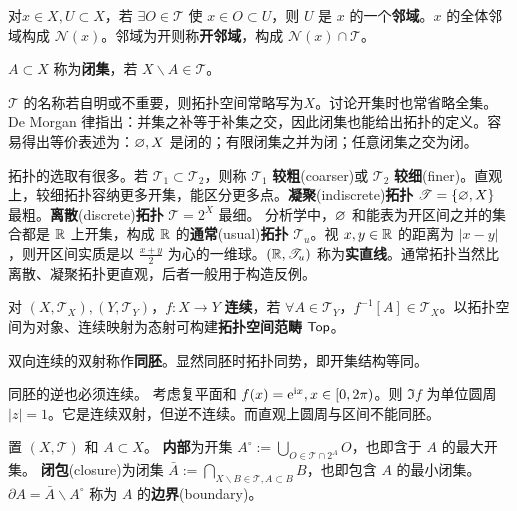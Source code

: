 \begin{definition}
    对$x\in X,U\subset X$，若 $\exists O\in\mathscr{T}$ 使 $x\in O\subset U$，则 $U$ 是 $x$ 的一个\textbf{邻域}。$x$ 的全体邻域构成 $\mathscr N(x)$。邻域为开则称\textbf{开邻域}，构成 $\mathscr N(x)\cap\mathscr T$。
\end{definition}

\begin{definition}
    $A\subset X$ 称为\textbf{闭集}，若 $X\backslash A\in\mathscr{T}$。
\end{definition}

$\mathscr T$ 的名称若自明或不重要，则拓扑空间常略写为$X$。讨论开集时也常省略全集。De Morgan 律指出：并集之补等于补集之交，因此闭集也能给出拓扑的定义。容易得出等价表述为：$\varnothing,X$ 是闭的；有限闭集之并为闭；任意闭集之交为闭。

拓扑的选取有很多。若 $\mathscr T_1\subset\mathscr T_2$，则称 $\mathscr T_1$ \textbf{较粗}(coarser)或 $\mathscr T_2$ \textbf{较细}(finer)。直观上，较细拓扑容纳更多开集，能区分更多点。\textbf{凝聚}(indiscrete)\textbf{拓扑} $\mathscr T=\{\varnothing,X\}$ 最粗。\textbf{离散}(discrete)\textbf{拓扑} $\mathscr T= 2^X$ 最细。
分析学中，$\varnothing$ 和能表为开区间之并的集合都是 $\mathbb{R}$ 上开集，构成 $\mathbb{R}$ 的\textbf{通常}(usual)\textbf{拓扑} $\mathscr T_u$。视 $x,y\in\mathbb{R}$ 的距离为 $|x-y|$，则开区间实质是以 $\frac{x+y}{2}$ 为心的一维球。$(\mathbb{R},\mathscr T_u)$ 称为\textbf{实直线}。通常拓扑当然比离散、凝聚拓扑更直观，后者一般用于构造反例。

\begin{definition}
    对 $(X,\mathscr T_X),(Y,\mathscr T_Y)$，$f: X \to Y$ \textbf{连续}，若 $\forall A\in\mathscr T_Y$，$f^{-1}[A]\in \mathscr T_X$。以拓扑空间为对象、连续映射为态射可构建\textbf{拓扑空间范畴} $\mathsf{Top}$。
\end{definition}

\begin{definition}
    双向连续的双射称作\textbf{同胚}。显然同胚时拓扑同势，即开集结构等同。
\end{definition}

\begin{remark}
    同胚的逆也必须连续。
    考虑复平面和 $f(x)=\mathrm{e}^{\mathrm{i} x},x\in [0,2\pi)$。则 $\Im f$ 为单位圆周 $|z|=1$。它是连续双射，但逆不连续。而直观上圆周与区间不能同胚。
\end{remark}

\begin{definition}
置 $(X,\mathscr T)$ 和 $A\subset X$。
\textbf{内部}为开集 $A^\circ:=\bigcup_{O\in\mathscr T\cap 2^A} O$，也即含于 $A$ 的最大开集。
\textbf{闭包}(closure)为闭集 $\bar{A}:=\bigcap_{X\backslash B\in\mathscr T,A\subset B} B$，也即包含 $A$ 的最小闭集。
$\partial A=\bar{A}\backslash A^\circ$ 称为 $A$ 的\textbf{边界}(boundary)。
\end{definition}

